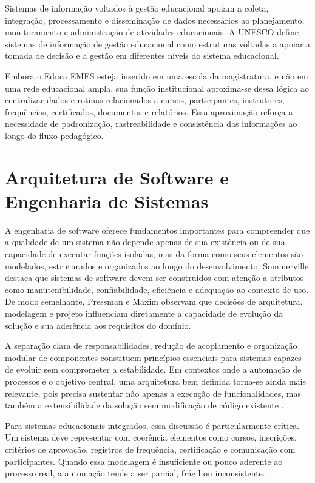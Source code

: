 Sistemas de informação voltados à gestão educacional apoiam a coleta,
integração, processamento e disseminação de dados necessários ao planejamento,
monitoramento e administração de atividades educacionais. A UNESCO
\cite{UNESCOEMIS2026} define sistemas de informação de gestão educacional como
estruturas voltadas a apoiar a tomada de decisão e a gestão em diferentes
níveis do sistema educacional.

Embora o Educa EMES esteja inserido em uma escola da magistratura, e não em uma
rede educacional ampla, sua função institucional aproxima-se dessa lógica ao
centralizar dados e rotinas relacionados a cursos, participantes, instrutores,
frequências, certificados, documentos e relatórios. Essa aproximação reforça a
necessidade de padronização, rastreabilidade e consistência das informações ao
longo do fluxo pedagógico.

\section{Arquitetura de Software e Engenharia de Sistemas}
\label{sec:revbib:engsoft}

A engenharia de software oferece fundamentos importantes para compreender que a
qualidade de um sistema não depende apenas de sua existência ou de sua
capacidade de executar funções isoladas, mas da forma como seus elementos são
modelados, estruturados e organizados ao longo do desenvolvimento.
Sommerville \cite{Sommerville2011} destaca que sistemas de software devem ser
construídos com atenção a atributos como manutenibilidade, confiabilidade,
eficiência e adequação ao contexto de uso. De modo semelhante, Pressman e
Maxim \cite{Pressman2014} observam que decisões de arquitetura, modelagem e
projeto influenciam diretamente a capacidade de evolução da solução e sua
aderência aos requisitos do domínio.

A separação clara de responsabilidades, redução de acoplamento e organização
modular de componentes constituem princípios essenciais para sistemas capazes
de evoluir sem comprometer a estabilidade. Em contextos onde a automação de
processos é o objetivo central, uma arquitetura bem definida torna-se ainda
mais relevante, pois precisa sustentar não apenas a execução de funcionalidades,
mas também a extensibilidade da solução sem modificação de código existente
\cite{Sommerville2011,Pressman2014}.

Para sistemas educacionais integrados, essa discussão é particularmente crítica.
Um sistema deve representar com coerência elementos como cursos, inscrições,
critérios de aprovação, registros de frequência, certificação e comunicação com
participantes. Quando essa modelagem é insuficiente ou pouco aderente ao
processo real, a automação tende a ser parcial, frágil ou inconsistente.


